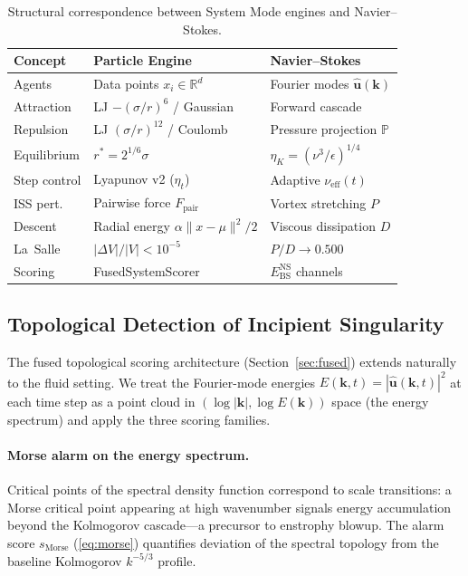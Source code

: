 \documentclass[final]{siamltex}
\newcommand{\R}{\mathbb{R}}
\newcommand{\norm}[1]{\lVert #1 \rVert}
\newcommand{\Ebs}{E_{\mathrm{BS}}}
\begin{document}
\begin{table}[htbp]
\centering
\caption{Structural correspondence between System Mode engines
and Navier--Stokes.}
\label{tab:ns_analogy}
\begin{tabular}{@{}lll@{}}
\toprule
Concept & Particle Engine & Navier--Stokes\\
\midrule
Agents        & Data points $x_i \in \R^d$
              & Fourier modes $\hat{\bm{u}}(\bm{k})$\\
Attraction    & LJ $-(\sigma/r)^6$ / Gaussian
              & Forward cascade\\
Repulsion     & LJ $(\sigma/r)^{12}$ / Coulomb
              & Pressure projection $\mathbb{P}$\\
Equilibrium   & $r^* = 2^{1/6}\sigma$
              & $\eta_K = (\nu^3/\epsilon)^{1/4}$\\
Step control  & Lyapunov v2 ($\eta_t$)
              & Adaptive $\nu_{\mathrm{eff}}(t)$\\
ISS pert.     & Pairwise force $F_{\mathrm{pair}}$
              & Vortex stretching $P$\\
Descent       & Radial energy $\alpha\norm{x-\mu}^2/2$
              & Viscous dissipation $D$\\
La~Salle      & $|\Delta V|/|V| < 10^{-5}$
              & $P/D \to 0.500$\\
Scoring       & FusedSystemScorer
              & $\Ebs^{\mathrm{NS}}$ channels\\
\bottomrule
\end{tabular}
\end{table}

\subsection{Topological Detection of Incipient
Singularity}\label{sec:ns:topo}

The fused topological scoring architecture
(Section~\ref{sec:fused}) extends naturally to the fluid setting.
We treat the Fourier-mode energies $E(\bm{k},t) =
|\hat{\bm{u}}(\bm{k},t)|^2$ at each time step as a
point cloud in $(\log|\bm{k}|, \log E(\bm{k}))$ space (the
energy spectrum) and apply the three scoring families.

\paragraph{Morse alarm on the energy spectrum.}
Critical points of the spectral density function correspond to
scale transitions: a Morse critical point appearing at high
wavenumber signals energy accumulation beyond the Kolmogorov
cascade---a precursor to enstrophy blowup.  The alarm score
$s_{\mathrm{Morse}}$ (\eqref{eq:morse}) quantifies deviation of
the spectral topology from the baseline Kolmogorov $k^{-5/3}$
profile.
\end{document}
